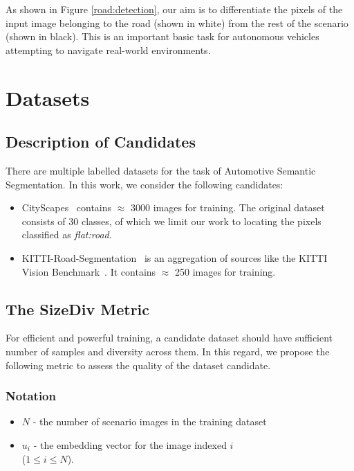 \documentclass[letterpaper, 10 pt, conference]{ieeeconf}  %
\begin{document}
As shown in Figure \ref{road:detection}, our aim is to differentiate the pixels of the input image belonging to the road (shown in white) from the rest of the scenario (shown in black). This is an important basic task for autonomous vehicles attempting to navigate real-world environments.


\section{Datasets}
\label{dataset}

\subsection{Description of Candidates}
There are multiple labelled datasets for the task of Automotive Semantic Segmentation. In this work, we consider the following candidates:

\begin{itemize}
    \item CityScapes~\cite{Cordts2016Cityscapes} contains $\approx$ 3000 images for training. The original dataset consists of 30 classes, of which we limit our work to locating the pixels classified as \textit{flat:road}.
    \item KITTI-Road-Segmentation~\cite{Mahna_2021} is an aggregation of sources like the KITTI Vision Benchmark~\cite{Fritsch2013ITSC}. It contains $\approx$ 250 images for training.
\end{itemize}

\subsection{The SizeDiv Metric}
\label{sizedev:intro}
For efficient and powerful training, a candidate dataset should have sufficient number of samples and diversity across them. In this regard, we propose the following metric to assess the quality of the dataset candidate.
\subsubsection{Notation}
\begin{itemize}
    \item $N$ - the number of scenario images in the training dataset
    \item $u_{i}$ - the embedding vector for the image indexed $i$ \\ ($1 \leq i \leq N$).
\end{itemize}
\end{document}
